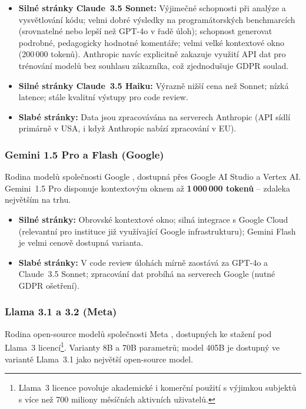 \begin{itemize}
    \item \textbf{Silné stránky Claude~3.5 Sonnet:} Výjimečné schopnosti při analýze a vysvětlování kódu; velmi dobré výsledky na programátorských benchmarcích (srovnatelné nebo lepší než GPT-4o v řadě úloh); schopnost generovat podrobné, pedagogicky hodnotné komentáře; velmi velké kontextové okno (200\,000 tokenů).
    Anthropic navíc explicitně zakazuje využití API dat pro trénování modelů bez souhlasu zákazníka, což zjednodušuje GDPR soulad.
    \item \textbf{Silné stránky Claude~3.5 Haiku:} Výrazně nižší cena než Sonnet; nízká latence; stále kvalitní výstupy pro code review.
    \item \textbf{Slabé stránky:} Data jsou zpracovávána na serverech Anthropic (API sídlí primárně v USA, i když Anthropic nabízí zpracování v EU).
\end{itemize}

\subsubsection*{Gemini 1.5 Pro a Flash (Google)}

Rodina modelů společnosti Google \cite{google_vertex}, dostupná přes Google AI Studio a Vertex AI.
Gemini~1.5 Pro disponuje kontextovým oknem až \textbf{1\,000\,000 tokenů} -- zdaleka největším na trhu.

\begin{itemize}
    \item \textbf{Silné stránky:} Obrovské kontextové okno; silná integrace s Google Cloud (relevantní pro instituce již využívající Google infrastrukturu); Gemini Flash je velmi cenově dostupná varianta.
    \item \textbf{Slabé stránky:} V code review úlohách mírně zaostává za GPT-4o a Claude~3.5 Sonnet; zpracování dat probíhá na serverech Google (nutné GDPR ošetření).
\end{itemize}

\subsubsection*{Llama 3.1 a 3.2 (Meta)}

Rodina open-source modelů společnosti Meta \cite{llama3_2024}, dostupných ke stažení pod Llama~3 licencí\footnote{Llama~3 licence povoluje akademické i komerční použití s výjimkou subjektů s více než 700 miliony měsíčních aktivních uživatelů.}.
Varianty 8B a 70B parametrů; model 405B je dostupný ve variantě Llama~3.1 jako největší open-source model.

